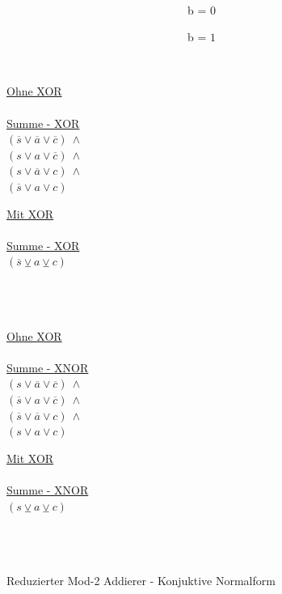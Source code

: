 \begin{figure}[!h]
  \centering
  \begin{minipage}[c]{0.3cm}
    ~
  \end{minipage}
  \begin{minipage}[c]{7.1cm}
    ~~~~~~~~~~~~~~~~~~~~~~~~~~~~~~~~b = $0$
  \end{minipage}
  \begin{minipage}[c]{7cm}
    ~~~~~~~~~~~~~~~~~~~~~~~~~~~~~~~~b = $1$
  \end{minipage}
  \begin{minipage}[l]{0.4cm}
    ~
  \end{minipage}
  \begin{minipage}[l]{3.5cm}
    \underline{Ohne XOR}\\
    ~\\
    \underline{Summe - XOR}\\
    $ (\overline{s} \vee \overline{a} \vee \overline{c}) ~ \wedge $\\
    $ (s \vee a \vee \overline{c}) ~ \wedge $\\
    $ (s \vee \overline{a} \vee c) ~ \wedge $\\
    $ (\overline{s} \vee a \vee c) $
  \end{minipage}
  \begin{minipage}[l]{3.5cm}
    \underline{Mit XOR}\\
    ~\\
    \underline{Summe - XOR}\\
    $ (\overline{s} \veebar a \veebar c) $\\
    ~\\
    ~\\
    ~
  \end{minipage}
  \begin{minipage}[l]{3.5cm}
    \underline{Ohne XOR}\\
    ~\\
    \underline{Summe - XNOR}\\
    $ (s \vee \overline{a} \vee \overline{c}) ~ \wedge $\\
    $ (\overline{s} \vee a \vee \overline{c}) ~ \wedge $\\
    $ (\overline{s} \vee \overline{a} \vee c) ~ \wedge $\\
    $ (s \vee a \vee c) $
  \end{minipage}
  \begin{minipage}[l]{3.5cm}
    \underline{Mit XOR}\\
    ~\\
    \underline{Summe - XNOR}\\
    $ (s \veebar a \veebar c) $\\
    ~\\
    ~\\
    ~
  \end{minipage}
  \caption{Reduzierter Mod-2 Addierer - Konjuktive Normalform}
  \label{fig:red_lastadder_cnf}
\end{figure}


